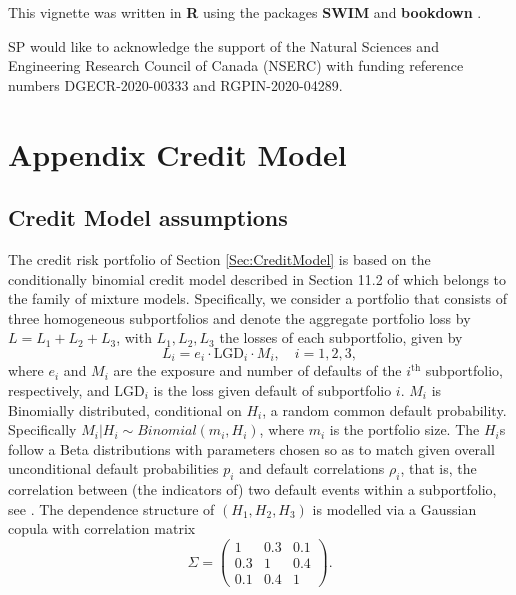 \documentclass[
]{article}
\begin{document}
This vignette was written in \textbf{R} \citep{R-base} using the packages \textbf{SWIM} \citep{PesentiR} and \textbf{bookdown} \citep{R-bookdown}.

SP would like to acknowledge the support of the Natural Sciences and Engineering Research Council of Canada
(NSERC) with funding reference numbers DGECR-2020-00333 and RGPIN-2020-04289.

\hypertarget{appendix-appendix}{%
\appendix}


\hypertarget{AppendixCM}{%
\section{Appendix Credit Model}\label{AppendixCM}}

\hypertarget{credit-model-assumptions}{%
\subsection{Credit Model assumptions}\label{credit-model-assumptions}}

The credit risk portfolio of Section \ref{Sec:CreditModel} is based on the conditionally binomial credit model described in Section 11.2 of \citet{Mcneil2015B} which belongs to the family of mixture models. Specifically, we consider a portfolio that consists of three homogeneous subportfolios and denote the aggregate portfolio loss by \(L = L_1 + L_2+ L_3\), with \(L_1, L_2, L_3\) the losses of each subportfolio, given by
\begin{equation}
L_i=e_i\cdot\text{LGD}_i\cdot M_i,\quad i=1,2,3, 
\end{equation}
where \(e_i\) and \(M_i\) are the exposure and number of defaults of the \(i^{\text{th}}\) subportfolio, respectively, and \(\text{LGD}_i\) is the loss given default of subportfolio \(i\). \(M_i\) is Binomially distributed, conditional on \(H_i\), a random common default probability. Specifically \(M_i|H_i \sim Binomial(m_i,H_i)\), where \(m_i\) is the portfolio size. The \(H_i\)s follow a Beta distributions with parameters chosen so as to match given overall unconditional default probabilities \(p_i\) and default correlations \(\rho_i\), that is, the correlation between (the indicators of) two default events within a subportfolio, see \citet{Mcneil2015B}. The dependence structure of \((H_1,H_2,H_3)\) is modelled via a Gaussian copula with correlation matrix\\
\begin{equation}\Sigma = \begin{pmatrix}
1 & 0.3 & 0.1\\
0.3 & 1 & 0.4\\
0.1 & 0.4 & 1
\end{pmatrix}.\end{equation}
\end{document}
